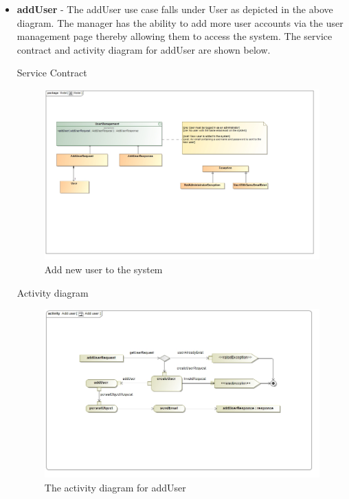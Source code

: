 \documentclass[english]{article}
\begin{document}
		\begin{itemize}
	  		\item \textbf{addUser} -  The addUser use case falls under User as depicted in the above diagram. The manager has the ability to add more user accounts via the user management page thereby allowing them to access the system. The service contract and activity diagram for addUser are shown below.
	  		
				\begin{center}
	  			Service Contract
	  		    \end{center}
	  		    
	  			\begin{figure}[H]
	  				\begin{center}
	  					\includegraphics[scale=0.25]{AddUserContract.jpg}
	  				\end{center}
	  				\caption{Add new user to the system}
	  				
	  			\end{figure}
	  		
	  			
	  			\begin{center}
	  				Activity diagram
	  			\end{center}
	  			
	  			\begin{figure}[H]
	  				\begin{center}
	  					\includegraphics[scale=0.3]{addUser1.jpg}
	  				\end{center}
	  				\caption{The activity diagram for addUser}
	  				

\end{figure}
\end{itemize}
\end{document}
